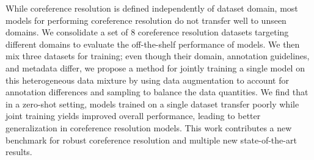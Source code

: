 While coreference resolution is defined independently of dataset domain, most models for performing coreference resolution do not transfer well to unseen domains. We consolidate a set of 8 coreference resolution datasets targeting different domains to evaluate the off-the-shelf performance of models. We then mix three datasets for training; even though their domain, annotation guidelines, and metadata differ, we propose a method for jointly training a single model on this heterogeneous data mixture by using data augmentation to account for annotation differences and sampling to balance the data quantities. We find that in a zero-shot setting, models trained on a single dataset transfer poorly while joint training yields improved overall performance, leading to better generalization in coreference resolution models. This work contributes a new benchmark for robust coreference resolution and multiple new state-of-the-art results.
